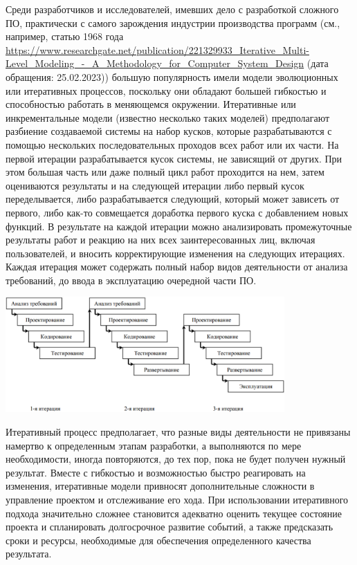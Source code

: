 \documentclass{../../text-style}
\begin{document}
Среди разработчиков и исследователей, имевших дело с разработкой сложного ПО, практически с самого зарождения индустрии производства программ (см., например, статью 1968 года \url{https://www.researchgate.net/publication/221329933_Iterative_Multi-Level_Modeling_-_A_Methodology_for_Computer_System_Design} (дата обращения: 25.02.2023)) большую популярность имели модели эволюционных или итеративных процессов, поскольку они обладают большей гибкостью и способностью работать в меняющемся окружении. Итеративные или инкрементальные модели (известно несколько таких моделей) предполагают разбиение создаваемой системы на набор кусков, которые разрабатываются с помощью нескольких последовательных проходов всех работ или их части. На первой итерации разрабатывается кусок системы, не зависящий от других. При этом большая часть или даже полный цикл работ проходится на нем, затем оцениваются результаты и на следующей итерации либо первый кусок переделывается, либо разрабатывается следующий, который может зависеть от первого, либо как-то совмещается доработка первого куска с добавлением новых функций. В результате на каждой итерации можно анализировать промежуточные результаты работ и реакцию на них всех заинтересованных лиц, включая пользователей, и вносить корректирующие изменения на следующих итерациях. Каждая итерация может содержать полный набор видов деятельности от анализа требований, до ввода в эксплуатацию очередной части ПО. 

\begin{center}
    \includegraphics[width=0.8\textwidth]{iterativeModel.png}
\end{center}

Итеративный процесс предполагает, что разные виды деятельности не привязаны намертво к определенным этапам разработки, а выполняются по мере необходимости, иногда повторяются, до тех пор, пока не будет получен нужный результат. Вместе с гибкостью и возможностью быстро реагировать на изменения, итеративные модели привносят дополнительные сложности в управление проектом и отслеживание его хода. При использовании итеративного подхода значительно сложнее становится адекватно оценить текущее состояние проекта и спланировать долгосрочное развитие событий, а также предсказать сроки и ресурсы, необходимые для обеспечения определенного качества результата.
\end{document}
